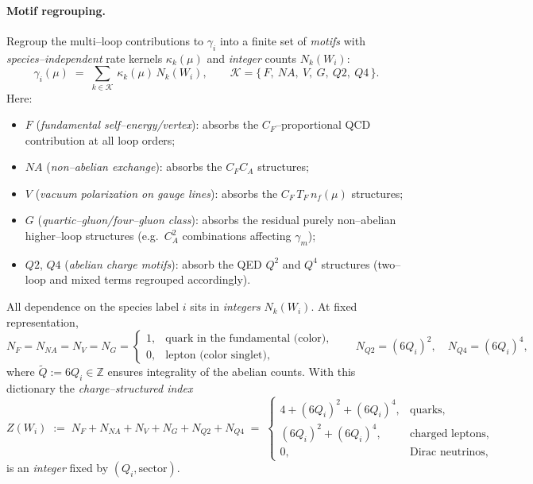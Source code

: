 \documentclass[aps,prd,onecolumn,amsmath,amssymb,superscriptaddress,nofootinbib,showpacs,showkeys]{revtex4-2}
\begin{document}
\paragraph{Motif regrouping.}
Regroup the multi--loop contributions to $\gamma_i$ into a finite set of \emph{motifs} with \emph{species--independent} rate kernels $\kappa_k(\mu)$ and \emph{integer} counts $N_k(W_i)$:
\begin{equation}
  \gamma_i(\mu) \;=\; \sum_{k\in\mathcal K}\,\kappa_k(\mu)\,N_k(W_i),
  \qquad
  \mathcal K=\{\,F,\ NA,\ V,\ G,\ Q2,\ Q4\,\}.
  \label{eq:A-motif}
\end{equation}
Here:
\begin{itemize}
  \item $F$ (\emph{fundamental self--energy/vertex}): absorbs the $C_F$--proportional QCD contribution at all loop orders;
  \item $NA$ (\emph{non--abelian exchange}): absorbs the $C_FC_A$ structures;
  \item $V$ (\emph{vacuum polarization on gauge lines}): absorbs the $C_F\,T_F\,n_f(\mu)$ structures;
  \item $G$ (\emph{quartic--gluon/four--gluon class}): absorbs the residual purely non--abelian higher--loop structures (e.g.\ $C_A^2$ combinations affecting $\gamma_m$);
  \item $Q2$, $Q4$ (\emph{abelian charge motifs}): absorb the QED $Q^2$ and $Q^4$ structures (two--loop and mixed terms regrouped accordingly).
\end{itemize}
All dependence on the species label $i$ sits in \emph{integers} $N_k(W_i)$.  At fixed representation,
\[
  N_F=N_{NA}=N_V=N_G=
  \begin{cases}
    1,& \text{quark in the fundamental (color)},\\
    0,& \text{lepton (color singlet)},
  \end{cases}
\qquad
N_{Q2}=(6Q_i)^2,\quad N_{Q4}=(6Q_i)^4,
\]
where $\tilde Q:=6Q_i\in\mathbb Z$ ensures integrality of the abelian counts.
With this dictionary the \emph{charge--structured index}
\begin{equation}
  Z(W_i)\;:=\;N_F+N_{NA}+N_V+N_G+N_{Q2}+N_{Q4}
  \;=\;
  \begin{cases}
    4+(6Q_i)^2+(6Q_i)^4,& \text{quarks},\\[2pt]
    (6Q_i)^2+(6Q_i)^4,& \text{charged leptons},\\[2pt]
    0,& \text{Dirac neutrinos},
  \end{cases}
  \label{eq:A-Z.def}
\end{equation}
is an \emph{integer} fixed by $(Q_i,\text{sector})$.
\end{document}
